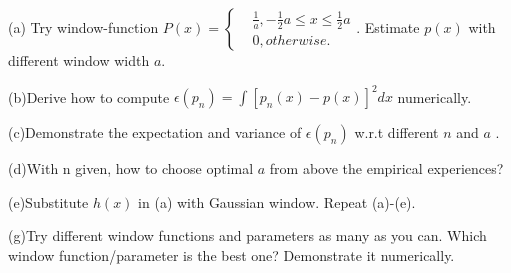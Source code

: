 \documentclass{article}
\theoremstyle{definition}
\theoremstyle{definition}
\theoremstyle{remark}
\begin{document}
(a) Try window-function $P(x)=\left\{
\begin{aligned}
&\frac{1}{a},-\frac{1}{2}a\leq x\leq \frac{1}{2}a \\
&0,otherwise.
\end{aligned}
\right.$. Estimate $p(x)$ with different window width $a$.

(b)Derive how to compute $\epsilon(p_n)=\int[p_n(x)-p(x)]^2dx$ numerically.

(c)Demonstrate the expectation and variance of $\epsilon(p_n)$ w.r.t different $n$ and $a$ .

(d)With n given, how to choose optimal $a$ from above the empirical experiences?

(e)Substitute $h(x)$ in (a) with Gaussian window. Repeat (a)-(e).

(g)Try different window functions and parameters as many as you can. Which window
function/parameter is the best one? Demonstrate it numerically.





\end{document}
